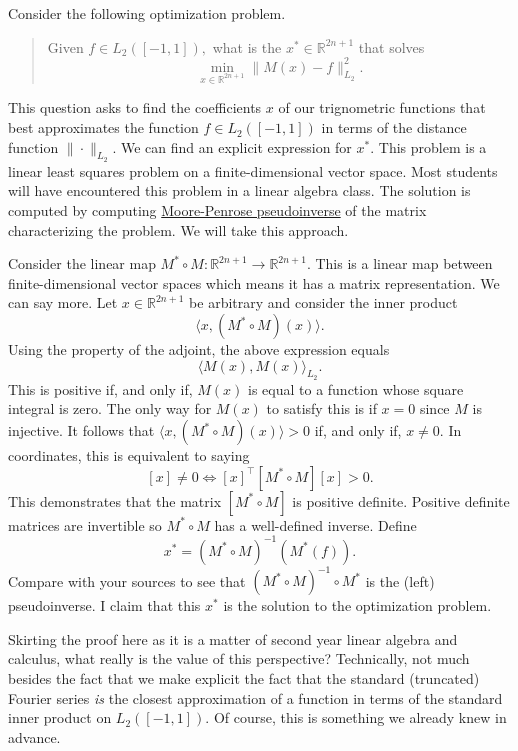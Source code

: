 Consider the following optimization problem.
%
\begin{quote}
  Given \(f \in L_2([-1, 1]),\) what is the \(x^* \in \mathbb{R}^{2n+1}\) that solves
  \[
    \min_{x \in \mathbb{R}^{2n+1}} \| M(x) - f \|_{L_2}^2.
  \]
\end{quote}
%
This question asks to find the coefficients \(x\) of our trignometric functions that best approximates the function \(f \in L_2([-1, 1])\) in terms of the distance function \(\|\cdot\|_{L_2}.\)
We can find an explicit expression for \(x^*.\)
This problem is a linear least squares problem on a finite-dimensional vector space.
Most students will have encountered this problem in a linear algebra class.
The solution is computed by computing \href{https://en.wikipedia.org/wiki/Moore%E2%80%93Penrose_inverse}{Moore-Penrose pseudoinverse} of the matrix characterizing the problem.
We will take this approach.

Consider the linear map \(M^* \circ M: \mathbb{R}^{2n+1} \to \mathbb{R}^{2n+1}.\)
This is a linear map between finite-dimensional vector spaces which means it has a matrix representation.
We can say more.
Let \(x \in \mathbb{R}^{2n+1}\) be arbitrary and consider the inner product
\[
  \langle x, (M^* \circ M)(x) \rangle.
\]
Using the property of the adjoint, the above expression equals
\[
  \langle M(x), M(x) \rangle_{L_2}.
\]
This is positive if, and only if, \(M(x)\) is equal to a function whose square integral is zero.
The only way for \(M(x)\) to satisfy this is if \(x = 0\) since \(M\) is injective.
It follows that \(\langle x, (M^* \circ M)(x) \rangle > 0\) if, and only if, \(x \neq 0.\)
In coordinates, this is equivalent to saying
\[
  [x] \neq 0 \iff [x]^\top [M^*\circ M] [x] > 0.
\]
This demonstrates that the matrix \([M^* \circ M]\) is positive definite.
Positive definite matrices are invertible so \(M^* \circ M\) has a well-defined inverse.
Define
\[
  x^* = \left(M^* \circ M\right)^{-1}\left(M^*(f)\right).
\]
Compare with your sources to see that \((M^* \circ M)^{-1} \circ M^*\) is the (left) pseudoinverse.
I claim that this \(x^*\) is the solution to the optimization problem.

Skirting the proof here as it is a matter of second year linear algebra and calculus, what really is the value of this perspective?
Technically, not much besides the fact that we make explicit the fact that the standard (truncated) Fourier series \emph{is} the closest approximation of a function in terms of the standard inner product on \(L_2([-1, 1]).\)
Of course, this is something we already knew in advance.

